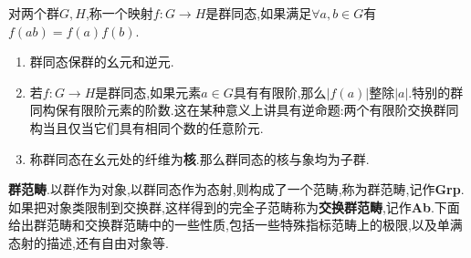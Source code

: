 对两个群$G,H$,称一个映射$f:G\to H$是群同态,如果满足$\forall a,b\in G$有$f(ab)=f(a)f(b)$.
\begin{enumerate}
	\item 群同态保群的幺元和逆元.
	\item 若$f:G\to H$是群同态,如果元素$a\in G$具有有限阶,那么$|f(a)|$整除$|a|$.特别的群同构保有限阶元素的阶数.这在某种意义上讲具有逆命题:两个有限阶交换群同构当且仅当它们具有相同个数的任意阶元.
	\item 称群同态在幺元处的纤维为\textbf{核}.那么群同态的核与象均为子群.
\end{enumerate}

\textbf{群范畴}.以群作为对象,以群同态作为态射,则构成了一个范畴,称为群范畴,记作\textbf{Grp}.如果把对象类限制到交换群,这样得到的完全子范畴称为\textbf{交换群范畴},记作\textbf{Ab}.下面给出群范畴和交换群范畴中的一些性质,包括一些特殊指标范畴上的极限,以及单满态射的描述,还有自由对象等.
